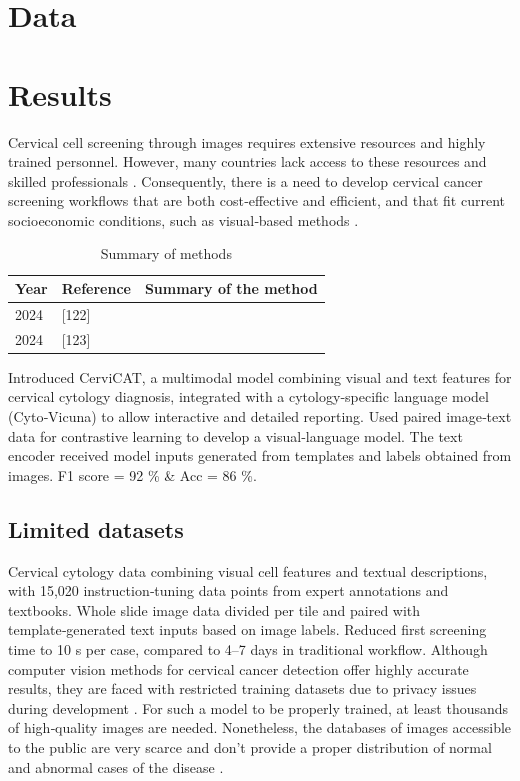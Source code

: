 \documentclass[final,5p,times,twocolumn,authoryear]{elsarticle}
\begin{document}
\section{Data}
\section{Results}
Cervical cell screening through images requires extensive resources and highly trained personnel. However, many countries lack access to these resources and skilled professionals \cite{130}. Consequently, there is a need to develop cervical cancer screening workflows that are both cost‑effective and efficient, and that fit current socioeconomic conditions, such as visual‑based methods \cite{131}.
\begin{table}[htbp]
\centering
\caption{Summary of methods}
\label{tab:summary}
\begin{tabular}{lll}
\hline
Year & Reference & Summary of the method \\
\hline
2024 & [122] & \\
2024 & [123] & \\
\hline
\end{tabular}
\end{table}
Introduced CerviCAT, a multimodal model combining visual and text features for cervical cytology diagnosis, integrated with a cytology‑specific language model (Cyto‑Vicuna) to allow interactive and detailed reporting. Used paired image‑text data for contrastive learning to develop a visual‑language model. The text encoder received model inputs generated from templates and labels obtained from images. F1 score = 92 \% \& Acc = 86 \%.
\subsection{Limited datasets}
Cervical cytology data combining visual cell features and textual descriptions, with 15,020 instruction‑tuning data points from expert annotations and textbooks. Whole slide image data divided per tile and paired with template‑generated text inputs based on image labels. Reduced first screening time to 10 s per case, compared to 4–7 days in traditional workflow. Although computer vision methods for cervical cancer detection offer highly accurate results, they are faced with restricted training datasets due to privacy issues during development \cite{132,133,134}. For such a model to be properly trained, at least thousands of high‑quality images are needed. Nonetheless, the databases of images accessible to the public are very scarce and don’t provide a proper distribution of normal and abnormal cases of the disease \cite{135,136,137}.
\end{document}
